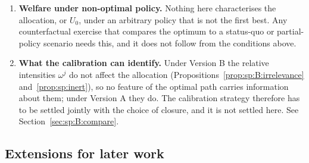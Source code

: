 \begin{enumerate}[label=\textbf{O\arabic*.},ref=O\arabic*,leftmargin=2.6em,itemsep=0.35em]
\item\label{op:sp:nonopt} \textbf{Welfare under non-optimal policy.} Nothing here characterises the
allocation, or $U_0$, under an arbitrary policy that is not the first best. Any counterfactual
exercise that compares the optimum to a status-quo or partial-policy scenario needs this, and it does
not follow from the conditions above.

\item\label{op:sp:identify} \textbf{What the calibration can identify.} Under Version B the relative
intensities $\omega^j$ do not affect the allocation
(Propositions~\ref{prop:sp:B:irrelevance} and~\ref{prop:sp:inert}), so no feature of the optimal path
carries information about them; under Version A they do. The calibration strategy therefore has to be
settled jointly with the choice of closure, and it is not settled here. See
Section~\ref{sec:sp:B:compare}.

\end{enumerate}


\subsection{Extensions for later work}\label{sec:sp:ext:later}

